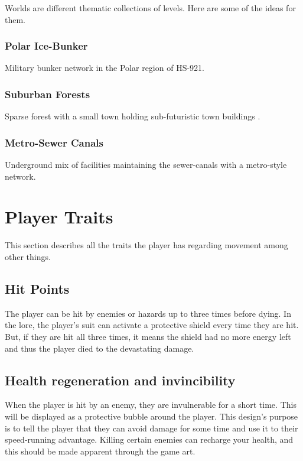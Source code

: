 \documentclass[12pt]{article}
\begin{document}
Worlds are different thematic collections of levels. Here are some of the ideas for them.

\subsubsection{Polar Ice-Bunker}

Military bunker network in the Polar region of HS-921. 

\subsubsection{Suburban Forests}

Sparse forest with a small town holding sub-futuristic town buildings .

\subsubsection{Metro-Sewer Canals}

Underground mix of facilities maintaining the sewer-canals with a metro-style network. 

\section{Player Traits}

This section describes all the traits the player has regarding movement among other things.

\subsection{Hit Points}

The player can be hit by enemies or hazards up to three times before dying. In the lore, the player's suit can activate a protective shield every time they are hit. But, if they are hit all three times, it means the shield had no more energy left and thus the player died to the devastating damage. 


\subsection{Health regeneration and invincibility}

When the player is hit by an enemy, they are invulnerable for a short time. This will be displayed as a protective bubble around the player. This design's purpose is to tell the player that they can avoid damage for some time and use it to their speed-running advantage. Killing certain enemies can recharge your health, and this should be made apparent through the game art. 
\end{document}
